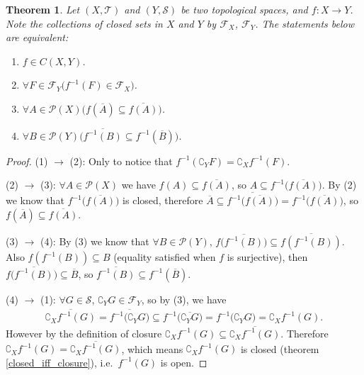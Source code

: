 \documentclass{article}%
\theoremstyle{plain}
\newtheorem{theorem}{Theorem}[section] %
\theoremstyle{definition}
\begin{document}
\begin{theorem}
Let $(X, \mathscr T)$ and $(Y,\mathscr S)$ be two topological spaces, and $f\colon X\to Y$. Note the collections of closed sets in $X$ and $Y$ by $\mathscr F_X$, $\mathscr F_Y$.
The statements below are equivalent:
\begin{enumerate}[(1)]
\item $f\in C(X,Y)$.
\item $\forall F\in\mathscr F_Y \big(
	f^{-1} (F) \in \mathscr F_X\big)$.
\item $\forall A\in \mathscr P(X) \big(
	f(\overline A) \subseteq \overline{ f(A)}\big)$.
\item $\forall B\in \mathscr P(Y) \big(
	\overline{f^{-1} (B)}\subseteq f^{-1} (\overline B) \big)$.
\end{enumerate} 
\end{theorem}
\begin{proof}
(1) $\to$ (2): Only to notice that $f^{-1} (\complement_Y F ) =\complement_X f^{-1} (F)$. 

(2) $\to$ (3): $\forall A \in \mathscr P(X)$ we have $f(A) \subseteq \overline{f(A)}$, so $A \subseteq f^{-1} \big(
	\overline{f(A)}\big)$. 
By (2) we know that $f^{-1} \big(\overline{f(A)}\big)$ is closed, therefore 
$\overline A \subseteq \overline{f^{-1} \big(\overline{f(A)}\big)} 
	= f^{-1} \big(\overline{f(A)}\big)$, so $f(\overline A) \subseteq \overline {f(A)}$.
	
(3) $\to$ (4): By (3) we know that $\forall B\in \mathscr P(Y)$, 
$f\big(\overline{f^{-1}(B)}\big) \subseteq \overline{f(f^{-1}(B))}$. 
Also $f(f^{-1}(B)) \subseteq B$ (equality satisfied when $f$ is surjective), 
then $f\big(\overline{f^{-1}(B)}\big) \subseteq \overline B$, 
so $\overline{f^{-1}(B)} \subseteq f^{-1} (\overline B)$.

(4) $\to$ (1): $\forall G\in \mathscr S$, $\complement_Y G \in \mathscr F_Y$, so by (3), we have
\begin{align*}
	\overline {\complement_X f^{-1}(G)} =\overline {f^{-1}\big(\complement_Y G\big)} 
		\subseteq  f^{-1}\big(\overline{\complement_Y G}\big) = f^{-1}\big(\complement_Y G\big)
			=\complement_X f^{-1}(G).
\end{align*}
However by the definition of closure $\complement_X f^{-1}(G) \subseteq \overline {\complement_X f^{-1}(G)}$.
Therefore $\complement_X f^{-1}(G) = \overline {\complement_X f^{-1}(G)}$, which means $\complement_X f^{-1}(G)$ is closed (theorem \ref{closed_iff_closure}), i.e.\ $f^{-1}(G)$ is open. 
\end{proof}
\end{document}
